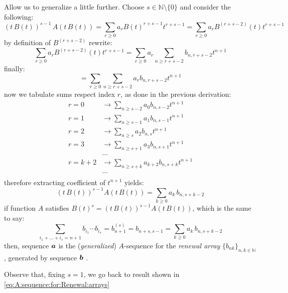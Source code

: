 Allow us to generalize a little further. Choose 
$s\in\mathbb{N}\setminus\lbrace0\rbrace$ and consider the following:
\begin{displaymath}
    (t\,B(t))^{s-1}\,A\left(t\,B(t)\right) 
        = \sum_{r\geq 0}{a_{r}B(t)^{r+s-1}t^{r+s-1}}
        = \sum_{r\geq 0}{a_{r}B^{(r+s-2)}(t)t^{r+s-1}}
\end{displaymath}
by definition of $B^{(r+s-2)}$ rewrite:
\begin{displaymath}
    \sum_{r\geq 0}{a_{r}B^{(r+s-2)}(t)t^{r+s-1}}
        =\sum_{r\geq 0}{a_{r}\sum_{n\geq r+s-2}{b_{n,r+s-2}t^{n+1}}}
\end{displaymath}
finally:
\begin{displaymath}
    =\sum_{r\geq 0}{\sum_{n\geq r+s-2}{a_{r}b_{n,r+s-2}t^{n+1}}}
\end{displaymath}
now we tabulate sums respect index $r$, as done in the previous derivation:
\begin{displaymath}
    \begin{split}
        r=0 &\rightarrow \sum_{n\geq s-2}{a_{0}b_{n,s-2}t^{n+1}}\\
        r=1 &\rightarrow \sum_{n\geq s-1}{a_{1}b_{n,s-1}t^{n+1}}\\
        r=2 &\rightarrow \sum_{n\geq s}{a_{2}b_{n,s}t^{n+1}}\\
        r=3 &\rightarrow \sum_{n\geq s+1}{a_{3}b_{n,s+1}t^{n+1}}\\
        &\ldots\\
        r=k+2 &\rightarrow \sum_{n\geq s+k}{a_{k+2}b_{n,s+k}t^{n+1}}\\
        &\ldots\\
    \end{split}
\end{displaymath}
therefore extracting coefficient of $t^{n+1}$ yields:
\begin{displaymath}
    [t^{n+1}](t\,B(t))^{s-1}A(t\,B(t))=\sum_{k\geq 0}{a_{k}\,b_{n,s+k-2}}
\end{displaymath}
if function $A$ satisfies 
$B(t)^{s}=(t\,B(t))^{s-1}A(t\,B(t))$, which is the same to say:
\begin{equation}
    \sum_{i_{1}+\ldots+i_{s}=n+1}{b_{i_{1}}\cdots b_{i_{s}}}
        =b_{n+1}^{(s)}
        =b_{n+s,s-1}
        =\sum_{k\geq 0}{a_{k}\,b_{n,s+k-2}}
    \label{eq:generalized:A:sequence:for:Renewal:arrays}
\end{equation}
then, sequence $\boldsymbol{a}$ 
is the (\emph{generalized}) $A$-sequence for the \emph{renewal array}
$\lbrace b_{nk}\rbrace_{n,k\in\mathbb{N}}$, generated by sequence $\boldsymbol{b}$
.

Observe that, fixing $s=1$, we go back to result shown in
\autoref{eq:A:sequence:for:Renewal:arrays}

















